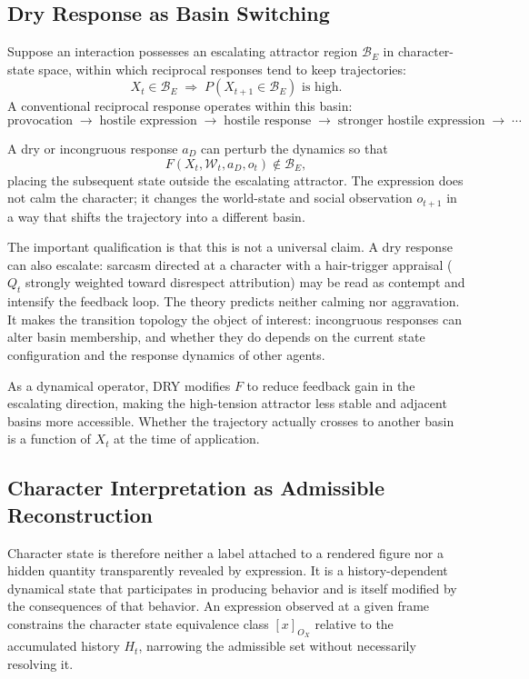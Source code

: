 \documentclass[11pt,a4paper]{article}
\theoremstyle{plain}
\theoremstyle{definition}
\theoremstyle{remark}
\begin{document}
\subsection{Dry Response as Basin Switching}

Suppose an interaction possesses an escalating attractor region $\mathcal{B}_E$ in character-state space, within which reciprocal responses tend to keep trajectories:
\[
X_t \in \mathcal{B}_E \;\Rightarrow\; P(X_{t+1} \in \mathcal{B}_E) \text{ is high.}
\]
A conventional reciprocal response operates within this basin:
\[
\text{provocation} \;\to\; \text{hostile expression} \;\to\; \text{hostile response} \;\to\; \text{stronger hostile expression} \;\to\; \cdots
\]

A dry or incongruous response $a_D$ can perturb the dynamics so that
\[
F(X_t, \mathcal{W}_t, a_D, o_t) \notin \mathcal{B}_E,
\]
placing the subsequent state outside the escalating attractor. The expression does not calm the character; it changes the world-state and social observation $o_{t+1}$ in a way that shifts the trajectory into a different basin.

The important qualification is that this is not a universal claim. A dry response can also escalate: sarcasm directed at a character with a hair-trigger appraisal ($Q_t$ strongly weighted toward disrespect attribution) may be read as contempt and intensify the feedback loop. The theory predicts neither calming nor aggravation. It makes the transition topology the object of interest: incongruous responses can alter basin membership, and whether they do depends on the current state configuration and the response dynamics of other agents.

As a dynamical operator, \textsc{DRY} modifies $F$ to reduce feedback gain in the escalating direction, making the high-tension attractor less stable and adjacent basins more accessible. Whether the trajectory actually crosses to another basin is a function of $X_t$ at the time of application.

\subsection{Character Interpretation as Admissible Reconstruction}

Character state is therefore neither a label attached to a rendered figure nor a hidden quantity transparently revealed by expression. It is a history-dependent dynamical state that participates in producing behavior and is itself modified by the consequences of that behavior. An expression observed at a given frame constrains the character state equivalence class $[x]_{O_X}$ relative to the accumulated history $H_t$, narrowing the admissible set without necessarily resolving it.
\end{document}
